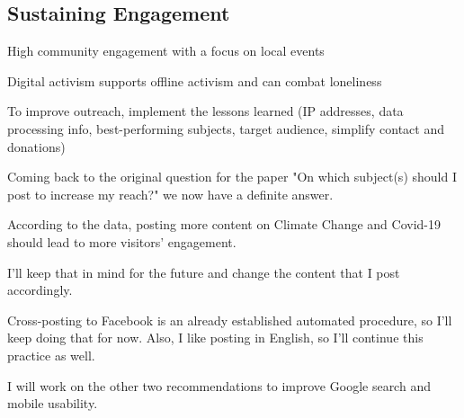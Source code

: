 \subsection{Sustaining Engagement}

High community engagement with a focus on local events

Digital activism supports offline activism and can combat loneliness

To improve outreach, implement the lessons learned (IP addresses, data processing info, best-performing subjects, target audience, simplify contact and donations)

Coming back to the original question for the paper "On which subject(s) should I post to increase my reach?" we now have a definite answer.

According to the data, posting more content on Climate Change and Covid-19 should lead to more visitors' engagement.

I'll keep that in mind for the future and change the content that I post accordingly.

Cross-posting to Facebook is an already established automated procedure, so I'll keep doing that for now. Also, I like posting in English, so I'll continue this practice as well.

I will work on the other two recommendations to improve Google search and mobile usability.
